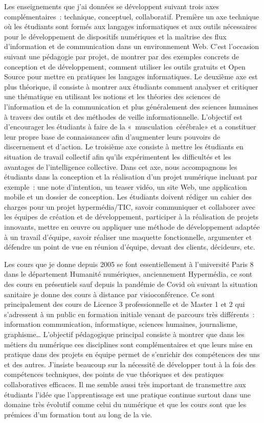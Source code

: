 \documentclass[
  letterpaper,
  DIV=11,
  numbers=noendperiod]{scrreprt}
\begin{document}
Les enseignements que j'ai données se développent suivant trois axes
complémentaires~: technique, conceptuel, collaboratif. Première un axe
technique où les étudiants sont formés aux langages informatiques et aux
outils nécessaires pour le développement de dispositifs numériques et la
maîtrise des flux d'information et de communication dans un
environnement Web. C'est l'occasion suivant une pédagogie par projet, de
montrer par des exemples concrets de conception et de développement,
comment utiliser les outils gratuits et Open Source pour mettre en
pratiques les langages informatiques. Le deuxième axe est plus
théorique, il consiste à montrer aux étudiants comment analyser et
critiquer une thématique en utilisant les notions et les théories des
sciences de l'information et de la communication et plus généralement
des sciences humaines à travers des outils et des méthodes de veille
informationnelle. L'objectif est d'encourager les étudiants à faire de
la «~musculation~cérébrale» et a constituer leur propre base de
connaissances afin d'augmenter leurs pouvoirs de discernement et
d'action. Le troisième axe consiste à mettre les étudiants en situation
de travail collectif afin qu'ils expérimentent les difficultés et les
avantages de l'intelligence collective. Dans cet axe, nous accompagnons
les étudiants dans la conception et la réalisation d'un projet numérique
incluant par exemple~: une note d'intention, un teaser vidéo, un site
Web, une application mobile et un dossier de conception. Les étudiants
doivent rédiger un cahier des charges pour un projet hypermédia/TIC,
savoir communiquer et collaborer avec les équipes de création et de
développement, participer à la réalisation de projets innovants, mettre
en œuvre ou appliquer une méthode de développement adaptée à un travail
d'équipe, savoir réaliser une maquette fonctionnelle, argumenter et
défendre un point de vue en réunion d'équipe, devant des clients,
décideurs, etc.

Les cours que je donne depuis 2005 se font essentiellement à
l'université Paris 8 dans le département Humanité numériques,
anciennement Hypermédia, ce sont des cours en présentiels sauf depuis la
pandémie de Covid où suivant la situation sanitaire je donne des cours à
distance par visioconférence. Ce sont principalement des cours de
Licence 3 professionnelle et de Master 1 et 2 qui s'adressent à un
public en formation initiale venant de parcours très différents~:
information communication, informatique, sciences humaines, journalisme,
graphisme\ldots{} L'objectif pédagogique principal consiste à montrer
que dans les métiers du numérique ces disciplines sont complémentaires
et que leurs mise en pratique dans des projets en équipe permet de
s'enrichir des compétences des uns et des autres. J'insiste beaucoup sur
la nécessité de développer tout à la fois des compétences techniques,
des points de vue théoriques et des pratiques collaboratives efficaces.
Il me semble aussi très important de transmettre aux étudiants l'idée
que l'apprentissage est une pratique continue surtout dans une domaine
très évolutif comme celui du numérique et que les cours sont que les
prémices d'un formation tout au long de la vie.
\end{document}
